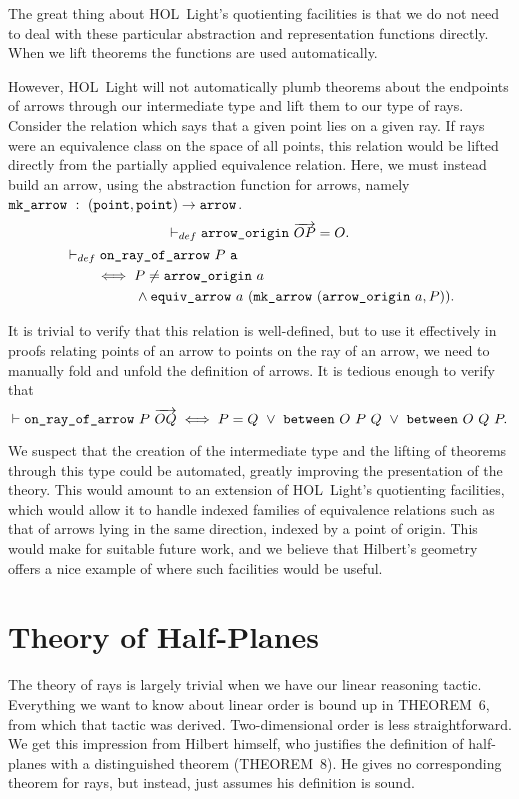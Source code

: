 The great thing about HOL~Light's quotienting facilities is that we do not need to deal with these particular abstraction and representation functions directly. When we lift theorems the functions are used automatically. 

However, HOL~Light will not automatically plumb theorems about the endpoints of arrows through our intermediate type and lift them to our type of rays. Consider the relation which says that a given point lies on a given ray. If rays were an equivalence class on the space of all points, this relation would be lifted directly from the partially applied equivalence relation. Here, we must instead build an arrow, using the abstraction function for arrows, namely $\code{mk\_arrow}\ :\ (\code{point},\code{point})\rightarrow\code{arrow}$.
\begin{gather*}
  \vdash_{def}\code{arrow\_origin}\ \overrightarrow{OP} = O.\\
  \begin{split}
    &\vdash_{def}\code{on\_ray\_of\_arrow}\ P\ \code{a}\\
    &\qquad\iff P \neq \code{arrow\_origin}\ a\\
    &\qquad\qquad\quad\wedge \code{equiv\_arrow}\ a\ (\code{mk\_arrow}\ (\code{arrow\_origin}\ a, P)).
  \end{split}
\end{gather*}

It is trivial to verify that this relation is well-defined, but to use it effectively in proofs relating points of an arrow to points on the ray of an arrow, we need to manually fold and unfold the definition of arrows. It is tedious enough to verify that
\begin{equation*}
  \vdash\code{on\_ray\_of\_arrow}\ P\ \overrightarrow{OQ} \iff P = Q\ \vee\ \between{O}{P}{Q}\ \vee\ \between{O}{Q}{P}.
\end{equation*}

We suspect that the creation of the intermediate  type and the lifting of theorems through this type could be automated, greatly improving the presentation of the theory. This would amount to an extension of HOL~Light's quotienting facilities, which would allow it to handle indexed families of equivalence relations such as that of arrows lying in the same direction, indexed by a point of origin. This would make for suitable future work, and we believe that Hilbert's geometry offers a nice example of where such facilities would be useful.

\section{Theory of Half-Planes}\label{sec:HalfPlaneTheory}
The theory of rays is largely trivial when we have our linear reasoning tactic. Everything we want to know about linear order is bound up in THEOREM~6, from which that tactic was derived. Two-dimensional order is less straightforward. We get this impression from Hilbert himself, who justifies the definition of half-planes with a distinguished theorem (THEOREM~8). He gives no corresponding theorem for rays, but instead, just assumes his definition is sound.

